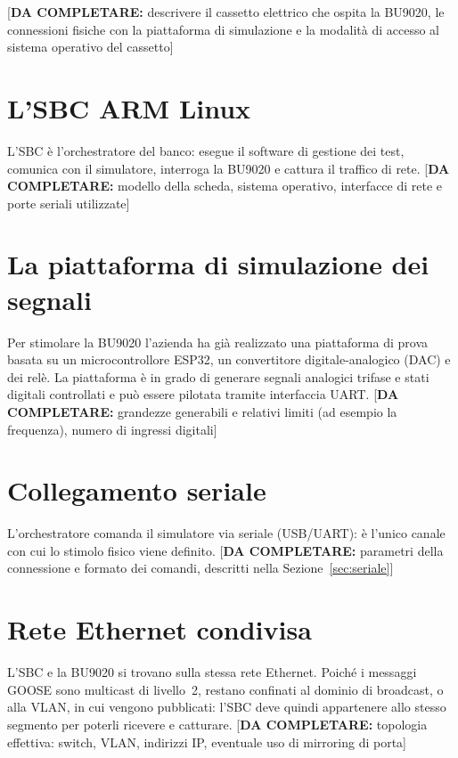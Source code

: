 \documentclass[11pt,a4paper,italian,oneside,openany]{book}
\newcommand{\daf}[1]{{\color{red}[\textbf{DA COMPLETARE:} #1]}}
\begin{document}
\daf{descrivere il cassetto elettrico che ospita la BU9020, le connessioni fisiche con la piattaforma di simulazione e la modalità di accesso al sistema operativo del cassetto}

\section{L'SBC ARM Linux}
L'SBC è l'orchestratore del banco: esegue il software di gestione dei test, comunica con il simulatore, interroga la BU9020 e cattura il traffico di rete. \daf{modello della scheda, sistema operativo, interfacce di rete e porte seriali utilizzate}

\section{La piattaforma di simulazione dei segnali}
Per stimolare la BU9020 l'azienda ha già realizzato una piattaforma di prova basata su un microcontrollore ESP32, un convertitore digitale-analogico (DAC) e dei relè. La piattaforma è in grado di generare segnali analogici trifase e stati digitali controllati e può essere pilotata tramite interfaccia UART. \daf{grandezze generabili e relativi limiti (ad esempio la frequenza), numero di ingressi digitali}

\section{Collegamento seriale}
L'orchestratore comanda il simulatore via seriale (USB/UART): è l'unico canale con cui lo stimolo fisico viene definito. \daf{parametri della connessione e formato dei comandi, descritti nella Sezione~\ref{sec:seriale}}

\section{Rete Ethernet condivisa}
L'SBC e la BU9020 si trovano sulla stessa rete Ethernet. Poiché i messaggi GOOSE sono multicast di livello~2, restano confinati al dominio di broadcast, o alla VLAN, in cui vengono pubblicati: l'SBC deve quindi appartenere allo stesso segmento per poterli ricevere e catturare. \daf{topologia effettiva: switch, VLAN, indirizzi IP, eventuale uso di mirroring di porta}
\end{document}
